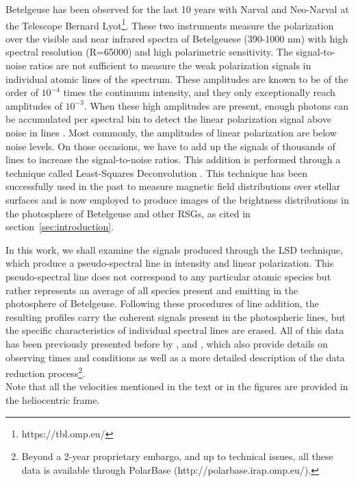 \documentclass{aa}
\begin{document}
Betelgeuse has been observed for the last 10 years with Narval and Neo-Narval at the Telescope Bernard Lyot\footnote[1]{https://tbl.omp.eu/}. These two instruments measure the polarization 
over the visible and near infrared spectra of Betelgeuese (390-1000 nm) with high spectral resolution (R=65000) and high polarimetric sensitivity. The signal-to-noise ratios are not sufficient to measure the weak polarization signals in individual atomic lines of the 
spectrum. These amplitudes are known to be of the order of $10^{-4}$ times the continuum intensity, and they only exceptionally reach amplitudes of $10^{-3}$. When these high amplitudes are present, enough photons can be accumulated per spectral bin to 
detect the linear polarization signal above noise in lines \citep{auriere_discovery_2016}. Most commonly, the amplitudes of linear polarization are below noise levels. On those 
occasions, we have to add up the signals of thousands of lines to increase the signal-to-noise ratios. This addition 
is performed through a technique called Least-Squares Deconvolution \citep[LSD;][]{donati_spectropolarimetric_1997}.%
This technique has been successfully used in the past to measure 
magnetic field distributions over stellar surfaces and is now employed to produce images of the brightness distributions in the photosphere 
of Betelgeuse and other RSGs, as cited in section~\ref{sec:introduction}. 

In this work, we shall examine the signals produced through the LSD technique, which produce a pseudo-spectral line in intensity 
and linear polarization. This pseudo-spectral line does not correspond to any particular atomic species but rather represents an average of all species present and emitting in the 
photosphere of Betelgeuse. Following these procedures of line addition, the resulting profiles carry the coherent signals present in the photospheric lines, but the specific characteristics of individual spectral lines are erased. All of this data has been previously presented before by \cite{auriere_discovery_2016}, \cite{mathias_evolution_2018} and 
\cite{lopez_ariste_three-dimensional_2022}, which also provide details on observing times and conditions as well as a more detailed description 
of the data reduction process\footnote[2]{Beyond a 2-year proprietary embargo, and up to technical issues, all these data is available through 
PolarBase (http://polarbase.irap.omp.eu/).}.\\
Note that all the velocities mentioned in the text or in the figures are provided in the heliocentric frame.
\end{document}
